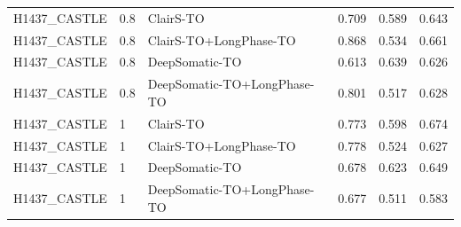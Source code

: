 \documentclass[pdflatex,sn-nature]{sn-jnl}
\begin{document}
{\begin{longtable}{@{}lllccc@{}}
  H1437\_CASTLE & 0.8 & ClairS-TO & 0.709 & 0.589 & 0.643 \\
  H1437\_CASTLE & 0.8 & ClairS-TO+LongPhase-TO & 0.868 & 0.534 & 0.661 \\
  H1437\_CASTLE & 0.8 & DeepSomatic-TO & 0.613 & 0.639 & 0.626 \\
  H1437\_CASTLE & 0.8 & DeepSomatic-TO+LongPhase-TO & 0.801 & 0.517 & 0.628 \\
  H1437\_CASTLE & 1 & ClairS-TO & 0.773 & 0.598 & 0.674 \\
  H1437\_CASTLE & 1 & ClairS-TO+LongPhase-TO & 0.778 & 0.524 & 0.627 \\
  H1437\_CASTLE & 1 & DeepSomatic-TO & 0.678 & 0.623 & 0.649 \\
  H1437\_CASTLE & 1 & DeepSomatic-TO+LongPhase-TO & 0.677 & 0.511 & 0.583 \\
\end{longtable}
}
\end{document}
